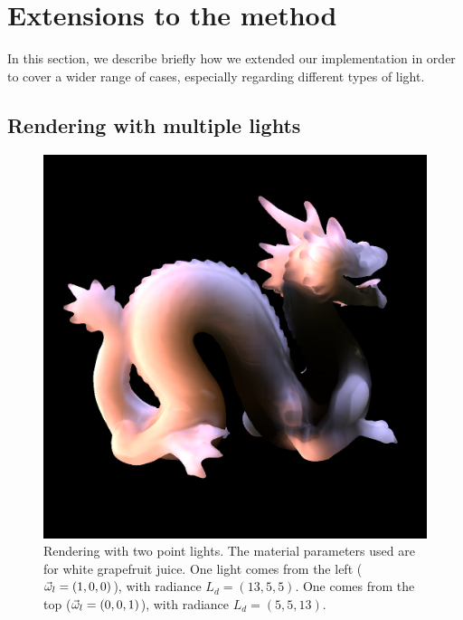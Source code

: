 \section{Extensions to the method}

In this section, we describe briefly how we extended our implementation in order to cover a wider range of cases, especially regarding different types of light.

\subsection{Rendering with multiple lights}

\begin{figure}[!h]
\centering
\includegraphics[width=0.9 \linewidth]{images/results/multiple.png}
\caption{Rendering with two point lights. The material parameters used are for white grapefruit juice. One light comes from the left ($\vec{\omega}_l = (1,0,0)$), with radiance $L_d = (13,5,5)$. One comes from the top ($\vec{\omega}_l = (0,0,1)$), with radiance $L_d = (5,5,13)$.}
\label{fig:multilight}
\end{figure}

